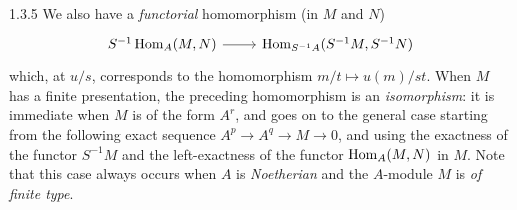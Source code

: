 \documentclass[../main.tex]{subfiles}
\begin{document}
\begin{cx}{1.3.5}
We also have a \emph{functorial} homomorphism (in $M$ and $N$)
\[\begin{tikzcd}
  S^{-1}\Hom_A(M,N)\ar[r] &\Hom_{S^{-1}A}(S^{-1}M,S^{-1}N)
\end{tikzcd}\]
which, at $u/s$, corresponds to the homomorphism $m/t\mapsto u(m)/st$. When $M$ has a finite presentation, the
preceding homomorphism is an \emph{isomorphism}: it is immediate when $M$ is of the form $A^r$, and goes on to the general
case starting from the following exact sequence $A^p\to A^q\to M\to 0$, and using the exactness of the functor $S^{-1}M$ and
the left-exactness of the functor $\operatorname{Hom}_A(M,N)$ in $M$. Note that this case always occurs when $A$ is \emph{Noetherian} and the
$A$-module $M$ is \emph{of finite type}.
\end{cx}
\end{document}
